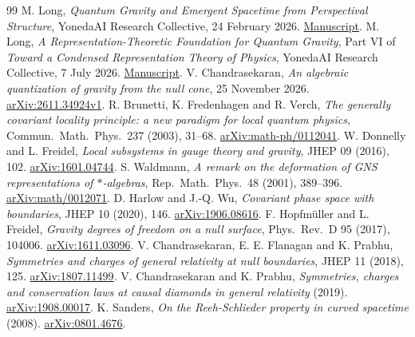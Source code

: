 \documentclass[11pt,letterpaper]{article}
\begin{document}
\begin{thebibliography}{99}
 M. Long, \emph{Quantum Gravity and Emergent Spacetime from Perspectival Structure}, YonedaAI Research Collective, 24 February 2026. \href{https://yonedaai.com/papers/pdf/quantum-gravity-emergent-spacetime.pdf}{Manuscript}.
 M. Long, \emph{A Representation-Theoretic Foundation for Quantum Gravity}, Part VI of \emph{Toward a Condensed Representation Theory of Physics}, YonedaAI Research Collective, 7 July 2026. \href{https://yonedaai.com/papers/pdf/library/condensed-representation/part6-condensed-quantum-gravity.pdf}{Manuscript}.
 V. Chandrasekaran, \emph{An algebraic quantization of gravity from the null cone}, 25 November 2026. \href{https://arxiv.org/abs/2611.34924v1}{arXiv:2611.34924v1}.
 R. Brunetti, K. Fredenhagen and R. Verch, \emph{The generally covariant locality principle: a new paradigm for local quantum physics}, Commun.\ Math.\ Phys.\ 237 (2003), 31--68. \href{https://arxiv.org/abs/math-ph/0112041}{arXiv:math-ph/0112041}.
 W. Donnelly and L. Freidel, \emph{Local subsystems in gauge theory and gravity}, JHEP 09 (2016), 102. \href{https://arxiv.org/abs/1601.04744}{arXiv:1601.04744}.
 S. Waldmann, \emph{A remark on the deformation of GNS representations of $*$-algebras}, Rep.\ Math.\ Phys.\ 48 (2001), 389--396. \href{https://arxiv.org/abs/math/0012071}{arXiv:math/0012071}.
 D. Harlow and J.-Q. Wu, \emph{Covariant phase space with boundaries}, JHEP 10 (2020), 146. \href{https://arxiv.org/abs/1906.08616}{arXiv:1906.08616}.
 F. Hopfm\"uller and L. Freidel, \emph{Gravity degrees of freedom on a null surface}, Phys.\ Rev.\ D 95 (2017), 104006. \href{https://arxiv.org/abs/1611.03096}{arXiv:1611.03096}.
 V. Chandrasekaran, E. E. Flanagan and K. Prabhu, \emph{Symmetries and charges of general relativity at null boundaries}, JHEP 11 (2018), 125. \href{https://arxiv.org/abs/1807.11499}{arXiv:1807.11499}.
 V. Chandrasekaran and K. Prabhu, \emph{Symmetries, charges and conservation laws at causal diamonds in general relativity} (2019). \href{https://arxiv.org/abs/1908.00017}{arXiv:1908.00017}.
 K. Sanders, \emph{On the Reeh-Schlieder property in curved spacetime} (2008). \href{https://arxiv.org/abs/0801.4676}{arXiv:0801.4676}.
\end{thebibliography}
\end{document}
